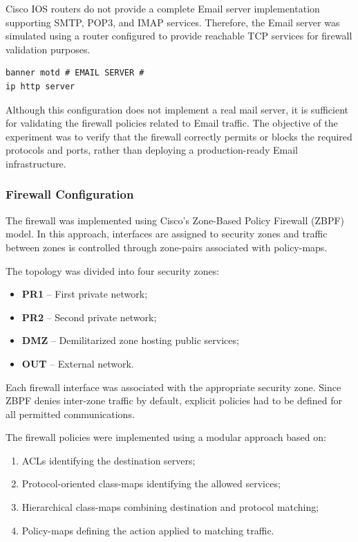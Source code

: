 \documentclass[12pt]{article}
\begin{document}
Cisco IOS routers do not provide a complete Email server implementation supporting SMTP, POP3, and IMAP services. Therefore, the Email server was simulated using a router configured to provide reachable TCP services for firewall validation purposes.

\begin{verbatim}
banner motd # EMAIL SERVER #
ip http server
\end{verbatim}

Although this configuration does not implement a real mail server, it is sufficient for validating the firewall policies related to Email traffic. The objective of the experiment was to verify that the firewall correctly permits or blocks the required protocols and ports, rather than deploying a production-ready Email infrastructure.

\subsubsection{Firewall Configuration}

The firewall was implemented using Cisco's Zone-Based Policy Firewall (ZBPF) model. In this approach, interfaces are assigned to security zones and traffic between zones is controlled through zone-pairs associated with policy-maps.

The topology was divided into four security zones:

\begin{itemize}
    \item \textbf{PR1} -- First private network;
    \item \textbf{PR2} -- Second private network;
    \item \textbf{DMZ} -- Demilitarized zone hosting public services;
    \item \textbf{OUT} -- External network.
\end{itemize}

Each firewall interface was associated with the appropriate security zone. Since ZBPF denies inter-zone traffic by default, explicit policies had to be defined for all permitted communications.

The firewall policies were implemented using a modular approach based on:

\begin{enumerate}
    \item ACLs identifying the destination servers;
    \item Protocol-oriented class-maps identifying the allowed services;
    \item Hierarchical class-maps combining destination and protocol matching;
    \item Policy-maps defining the action applied to matching traffic.
\end{enumerate}
\end{document}

